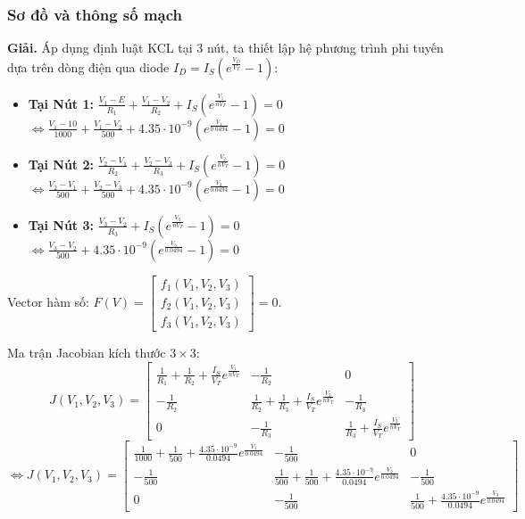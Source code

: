 \subsubsection*{Sơ đồ và thông số mạch}
{\textbf{Giải.}}
 Áp dụng định luật KCL tại 3 nút, ta thiết lập hệ phương trình phi tuyến dựa trên dòng điện qua diode $I_D = I_S(e^{\frac{V_D}{V_T}} - 1)$:
\begin{itemize}[label=\textbf{+}]
    \item \textbf{Tại Nút 1:} $\frac{V_1 - E}{R_1} + \frac{V_1 - V_2}{R_2} + I_S(e^{\frac{V_1}{n V_T}} - 1) = 0$ \\[8pt]
    $\Leftrightarrow \frac{V_1 - 10}{1000} + \frac{V_1 - V_2}{500} + 4.35 \cdot 10^{-9} \left( e^{\frac{V_1}{0.0494}} - 1 \right) = 0$
    
    \item \textbf{Tại Nút 2:} $\frac{V_2 - V_1}{R_2} + \frac{V_2 - V_3}{R_3} + I_S(e^{\frac{V_2}{n V_T}} - 1) = 0$ \\[8pt]
    $\Leftrightarrow \frac{V_2 - V_1}{500} + \frac{V_2 - V_3}{500} + 4.35 \cdot 10^{-9} \left( e^{\frac{V_2}{0.0494}} - 1 \right) = 0$
    
    \item \textbf{Tại Nút 3:} $\frac{V_3 - V_2}{R_3} + I_S(e^{\frac{V_3}{n V_T}} - 1) = 0$ \\[8pt]
    $\Leftrightarrow \frac{V_3 - V_2}{500} + 4.35 \cdot 10^{-9} \left( e^{\frac{V_3}{0.0494}} - 1 \right) = 0$
\end{itemize}

Vector hàm số: $F(V) = \begin{bmatrix} f_1(V_1, V_2, V_3) \\ f_2(V_1, V_2, V_3) \\ f_3(V_1, V_2, V_3) \end{bmatrix} = 0$.

Ma trận Jacobian kích thước $3 \times 3$:
\begin{equation}
J(V_1, V_2, V_3) = \begin{bmatrix} 
\frac{1}{R_1} + \frac{1}{R_2} + \frac{I_S}{V_T}e^{\frac{V_1}{n V_T}} & -\frac{1}{R_2} & 0 \\
-\frac{1}{R_2} & \frac{1}{R_2} + \frac{1}{R_3} + \frac{I_S}{V_T}e^{\frac{V_2}{n V_T}} & -\frac{1}{R_3} \\
0 & -\frac{1}{R_3} & \frac{1}{R_3} + \frac{I_S}{V_T}e^{\frac{V_3}{n V_T}}
\end{bmatrix}
\end{equation}
\[
\Leftrightarrow J(V_1, V_2, V_3) = \begin{bmatrix} 
    \frac{1}{1000} + \frac{1}{500} + \frac{4.35 \cdot 10^{-9}}{0.0494} e^{\frac{V_1}{0.0494}} & -\frac{1}{500} & 0 \\[12pt]
    -\frac{1}{500} & \frac{1}{500} + \frac{1}{500} + \frac{4.35 \cdot 10^{-9}}{0.0494} e^{\frac{V_2}{0.0494}} & -\frac{1}{500} \\[12pt]
    0 & -\frac{1}{500} & \frac{1}{500} + \frac{4.35 \cdot 10^{-9}}{0.0494} e^{\frac{V_3}{0.0494}} 
\end{bmatrix}
\]

